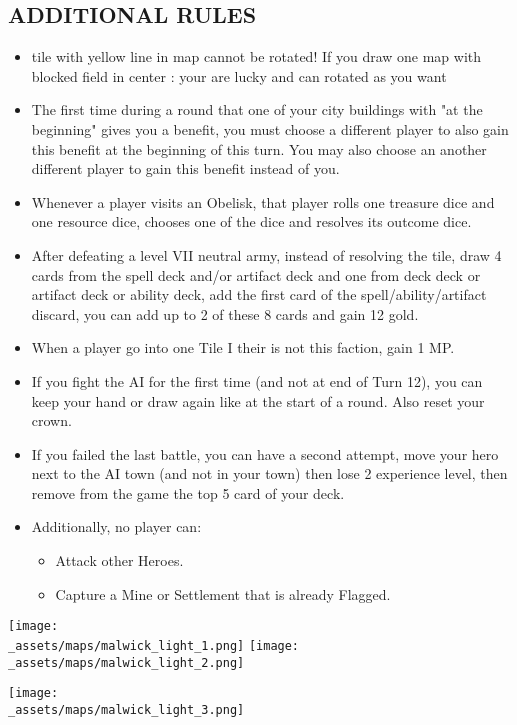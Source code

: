 \begin{multicols*}{2}
\subsection*{\MakeUppercase{Additional Rules}}
\begin{itemize}
    \item tile with yellow line in map cannot be rotated! If you draw one map with blocked field in center : your are lucky and can rotated as you want
    \item The first time during a round that one of your city buildings with "at the beginning" gives you a benefit, you must choose a different player to also gain this benefit at the beginning of this turn. You may also choose an another different player to gain this benefit instead of you.
    \item Whenever a player visits an Obelisk, that player rolls one treasure dice and one resource dice, chooses one of the dice and resolves its outcome dice.
    \item After defeating a level VII neutral army, instead of resolving the tile, draw 4 cards from the spell deck and/or artifact deck and one from deck deck or artifact deck or ability deck, add the first card of the spell/ability/artifact discard, you can add up to 2 of these 8 cards and gain 12 gold.
    \item When a player go into one Tile I their is not this faction, gain 1 MP.
    \item If you fight the AI for the first time (and not at end of Turn 12), you can keep your hand or draw again like at the start of a round. Also reset your crown.
    \item If you failed the last battle, you can have a second attempt, move your hero next to the AI town (and not in your town) then lose 2 experience level, then remove from the game the top 5 card of your deck.
    \item Additionally, no player can:
    \begin{itemize}
        \item Attack other Heroes.
        \item Capture a Mine or Settlement that is already Flagged.
    \end{itemize}
\end{itemize}

\vspace{2em}

\begin{center}
  \texttt{[image: \\\_assets/maps/malwick\_light\_1.png]}
  \vspace{3em}
  \texttt{[image: \\\_assets/maps/malwick\_light\_2.png]}
  \vspace{3em}
\end{center}

\end{multicols*}

\begin{center}
    \texttt{[image: \\\_assets/maps/malwick\_light\_3.png]}
\end{center}
